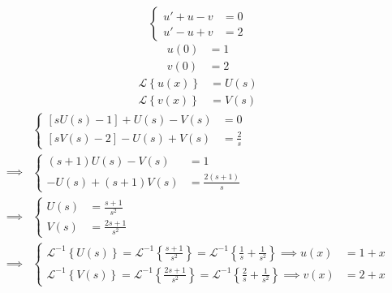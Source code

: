 \documentclass[11pt,a4paper,titlepage,final]{article}
\begin{document}
\begin{exercise*}{12.12} \[
	\begin{cases}
		u'+u-v &=0 \\
		u'-u+v &= 2
	\end{cases}
	\]
	\begin{align*}
	u(0) &= 1 \\
	v(0) &= 2
	\end{align*}
	\tcblower
	\begin{align*}
	\mathscr L\left\lbrace u(x) \right\rbrace &= U(s) \\
	\mathscr L\left\lbrace v(x) \right\rbrace &= V(s)
	\end{align*}
	\begin{align*}
&	\begin{cases}
	\left[sU(s)-1\right]+U(s)-V(s) &=0 \\
	\left[sV(s)-2\right]-U(s)+V(s) &= \frac{2}{s}
	\end{cases} \\ \implies& \begin{cases}
	(s+1)U(s) - V(s) &= 1 \\
	-U(s) + (s+1)V(s) &= \frac{2(s+1)}{s}
	\end{cases} \\ \implies &
	\begin{cases}
	U(s) &= \frac{s+1}{s^2} \\ V(s) &= \frac{2s+1}{s^2}
	\end{cases} \\ \implies&
	\begin{cases}
	\mathscr L^{-1} \left\lbrace U(s) \right\rbrace = \mathscr L^{-1} \left\lbrace \frac{s+1}{s^2} \right\rbrace = \mathscr L^{-1} \left\lbrace \frac{1}{s} +\frac{1}{s^2}\right\rbrace \implies u(x) &= 1+x \\
	\mathscr L^{-1}\left\lbrace V(s) \right\rbrace =  \mathscr L ^{-1}\left\lbrace \frac{2s+1}{s^2} \right\rbrace =  \mathscr L ^{-1}\left\lbrace \frac{2}{s} + \frac{1}{s^2} \right\rbrace \implies v(x) &= 2+x
	\end{cases}
	\end{align*}
	\end{exercise*}
\end{document}
